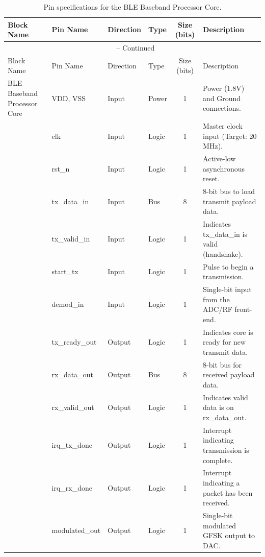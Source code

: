 \documentclass[12pt,singleside,a4paper]{report}
\begin{document}
\begin{longtable}{|p{2.5cm}|l|l|l|c|p{4.5cm}|}

    \caption{Pin specifications for the BLE Baseband Processor Core.}
    \label{tab:ble_pins} \\

    \hline
    Block Name & Pin Name & Direction & Type & Size (bits) & Description \\ \hline
    \endfirsthead

    \multicolumn{6}{c}{\tablename\ \thetable{} -- Continued} \\ \hline
    Block Name & Pin Name & Direction & Type & Size (bits) & Description \\ \hline
    \endhead

    \hline
    \endlastfoot

    BLE Baseband Processor Core & VDD, VSS & Input & Power & 1 & Power (1.8V) and Ground connections. \\ \hline
    ~ & clk & Input & Logic & 1 & Master clock input (Target: 20 MHz). \\ \hline
    ~ & rst\_n & Input & Logic & 1 & Active-low asynchronous reset. \\ \hline
    ~ & tx\_data\_in & Input & Bus & 8 & 8-bit bus to load transmit payload data. \\ \hline
    ~ & tx\_valid\_in & Input & Logic & 1 & Indicates tx\_data\_in is valid (handshake). \\ \hline
    ~ & start\_tx & Input & Logic & 1 & Pulse to begin a transmission. \\ \hline
    ~ & demod\_in & Input & Logic & 1 & Single-bit input from the ADC/RF front-end. \\ \hline
    ~ & tx\_ready\_out & Output & Logic & 1 & Indicates core is ready for new transmit data. \\ \hline
    ~ & rx\_data\_out & Output & Bus & 8 & 8-bit bus for received payload data. \\ \hline
    ~ & rx\_valid\_out & Output & Logic & 1 & Indicates valid data is on rx\_data\_out. \\ \hline
    ~ & irq\_tx\_done  & Output & Logic & 1 & Interrupt indicating transmission is complete. \\ \hline
    ~ & irq\_rx\_done & Output & Logic & 1 & Interrupt indicating a packet has been received. \\ \hline
    ~ & modulated\_out & Output & Logic & 1 & Single-bit modulated GFSK output to DAC. \\

\end{longtable}
\end{document}
